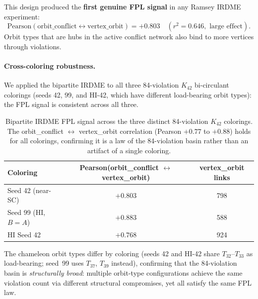\documentclass[11pt]{article}
\begin{document}
This design produced the \textbf{first genuine FPL signal} in any Ramsey
IRDME experiment:
\[
\text{Pearson}(\text{orbit\_conflict} \leftrightarrow \text{vertex\_orbit}) = +0.803
\quad (r^2 = 0.646, \text{ large effect}).
\]
Orbit types that are hubs in the active conflict network
also bind to more vertices through violations.

\paragraph{Cross-coloring robustness.}
We applied the bipartite IRDME to all three 84-violation $K_{42}$ bi-circulant colorings
(seeds 42, 99, and HI-42, which have different load-bearing orbit types):
the FPL signal is consistent across all three.

\begin{table}[h]
\centering
\begin{tabular}{lcc}
\toprule
Coloring & Pearson(orbit\_conflict $\leftrightarrow$ vertex\_orbit) & vertex\_orbit links \\
\midrule
Seed 42  (near-SC) & $+0.803$ & 798 \\
Seed 99  (HI, $B=A$)    & $+0.883$ & 588 \\
HI Seed 42          & $+0.768$ & 924 \\
\bottomrule
\end{tabular}
\caption{Bipartite IRDME FPL signal across the three distinct 84-violation $K_{42}$ colorings.
The orbit\_conflict $\leftrightarrow$ vertex\_orbit correlation (Pearson $+0.77$ to $+0.88$) holds
for all colorings, confirming it is a law of the 84-violation basin rather than an artifact of a
single coloring.}
\label{tab:fpl_cross}
\end{table}

The chameleon orbit types differ by coloring (seeds 42 and HI-42 share $T_{32}$--$T_{33}$ as
load-bearing; seed~99 uses $T_{37}$, $T_{39}$ instead), confirming that the 84-violation
basin is \emph{structurally broad}: multiple orbit-type configurations achieve the same
violation count via different structural compromises, yet all satisfy the same FPL law.
\end{document}
